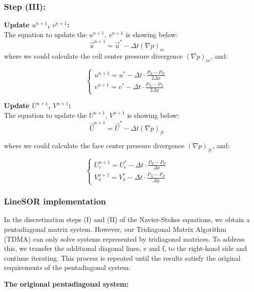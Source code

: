 \documentclass[12pt]{article}
\begin{document}
\subsubsection{Step (III):}
\textbf{Update $u^{n+1}$, $v^{n+1}$:}\\
The equation to update the $u^{n+1}$, $v^{n+1}$ is showing below:
$$
\vec{u}^{n+1} = \vec{u}^* - \Delta t (\nabla p)_{cc}
$$
where we could calculate the cell center pressure divergence $(\nabla p)_{cc}$, and:

$$
\begin{cases}
    u^{n+1} = u^* - \Delta t \cdot \frac{P_E - P_W}{2\Delta x} \\
    v^{n+1} = v^* - \Delta t \cdot \frac{P_N - P_S}{2\Delta y}
\end{cases}
$$


\textbf{Update $U^{n+1}$, $V^{n+1}$:}\\
The equation to update the $U^{n+1}$, $V^{n+1}$ is showing below:
$$
\vec{U}^{n+1} = \vec{U}^* - \Delta t (\nabla p)_{fc}
$$

where we could calculate the face center pressure divergence $(\nabla p)_{fc}$, and:


$$
\begin{cases}
    U_{e}^{n+1} = U_{e}^* - \Delta t \cdot \frac{P_E - P_P}{\Delta x} \\
    V_{n}^{n+1} = V_{n}^* - \Delta t \cdot \frac{P_N - P_P}{\Delta y}
    \end{cases}
$$

\subsubsection{LineSOR implementation}
In the discretization steps (I) and (II) of the Navier-Stokes equations, we obtain a pentadiagonal matrix system. However, our Tridiagonal Matrix Algorithm (TDMA) can only solve systems represented by tridiagonal matrices. To address this, we transfer the additional diagonal lines, e and f, to the right-hand side and continue iterating. This process is repeated until the results satisfy the original requirements of the pentadiagonal system.



\textbf{The origional pentadiagonal system:}\\
\end{document}
